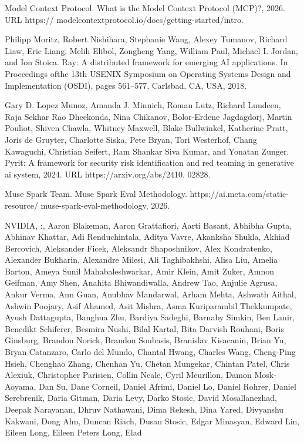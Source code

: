 \documentclass[
  10
]{article}
\begin{document}
Model Context Protocol. What is the Model Context Protocol (MCP)?, 2026.
URL https:// modelcontextprotocol.io/docs/getting-started/intro.

Philipp Moritz, Robert Nishihara, Stephanie Wang, Alexey Tumanov,
Richard Liaw, Eric Liang, Melih Elibol, Zongheng Yang, William Paul,
Michael I. Jordan, and Ion Stoica. Ray: A distributed framework for
emerging AI applications. In Proceedings ofthe 13th USENIX Symposium on
Operating Systems Design and Implementation (OSDI), pages 561--577,
Carlsbad, CA, USA, 2018.

Gary D. Lopez Munoz, Amanda J. Minnich, Roman Lutz, Richard Lundeen,
Raja Sekhar Rao Dheekonda, Nina Chikanov, Bolor-Erdene Jagdagdorj,
Martin Pouliot, Shiven Chawla, Whitney Maxwell, Blake Bullwinkel,
Katherine Pratt, Joris de Gruyter, Charlotte Siska, Pete Bryan, Tori
Westerhof, Chang Kawaguchi, Christian Seifert, Ram Shankar Siva Kumar,
and Yonatan Zunger. Pyrit: A framework for security risk identification
and red teaming in generative ai system, 2024. URL
https://arxiv.org/abs/2410. 02828.

Muse Spark Team. Muse Spark Eval Methodology.
https://ai.meta.com/static-resource/ muse-spark-eval-methodology, 2026.

NVIDIA, :, Aaron Blakeman, Aaron Grattafiori, Aarti Basant, Abhibha
Gupta, Abhinav Khattar, Adi Renduchintala, Aditya Vavre, Akanksha
Shukla, Akhiad Bercovich, Aleksander Ficek, Aleksandr Shaposhnikov, Alex
Kondratenko, Alexander Bukharin, Alexandre Milesi, Ali Taghibakhshi,
Alisa Liu, Amelia Barton, Ameya Sunil Mahabaleshwarkar, Amir Klein, Amit
Zuker, Amnon Geifman, Amy Shen, Anahita Bhiwandiwalla, Andrew Tao,
Anjulie Agrusa, Ankur Verma, Ann Guan, Anubhav Mandarwal, Arham Mehta,
Ashwath Aithal, Ashwin Poojary, Asif Ahamed, Asit Mishra, Asma
Kuriparambil Thekkumpate, Ayush Dattagupta, Banghua Zhu, Bardiya
Sadeghi, Barnaby Simkin, Ben Lanir, Benedikt Schiferer, Besmira Nushi,
Bilal Kartal, Bita Darvish Rouhani, Boris Ginsburg, Brandon Norick,
Brandon Soubasis, Branislav Kisacanin, Brian Yu, Bryan Catanzaro, Carlo
del Mundo, Chantal Hwang, Charles Wang, Cheng-Ping Hsieh, Chenghao
Zhang, Chenhan Yu, Chetan Mungekar, Chintan Patel, Chris Alexiuk,
Christopher Parisien, Collin Neale, Cyril Meurillon, Damon Mosk-Aoyama,
Dan Su, Dane Corneil, Daniel Afrimi, Daniel Lo, Daniel Rohrer, Daniel
Serebrenik, Daria Gitman, Daria Levy, Darko Stosic, David Mosallanezhad,
Deepak Narayanan, Dhruv Nathawani, Dima Rekesh, Dina Yared, Divyanshu
Kakwani, Dong Ahn, Duncan Riach, Dusan Stosic, Edgar Minasyan, Edward
Lin, Eileen Long, Eileen Peters Long, Elad
\end{document}
